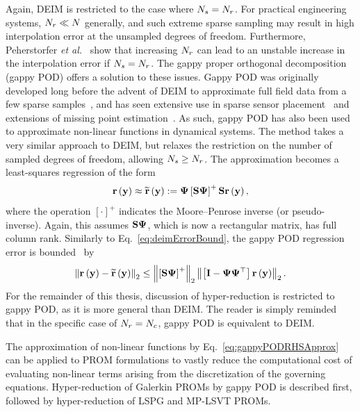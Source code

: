 Again, DEIM is restricted to the case where $N_s = N_r$. For practical engineering systems, $N_r \ll N$ generally, and such extreme sparse sampling may result in high interpolation error at the unsampled degrees of freedom. Furthermore, Peherstorfer \textit{et al.}~\cite{Peherstorfer2020} show that increasing $N_r$ can lead to an unstable increase in the interpolation error if $N_s = N_r$. The gappy proper orthogonal decomposition (gappy POD) offers a solution to these issues. Gappy POD was originally developed long before the advent of DEIM to approximate full field data from a few sparse samples~\cite{Everson1995}, and has seen extensive use in sparse sensor placement~\cite{Willcox2006,ManoharSparseSensor} and extensions of missing point estimation~\cite{Zimmermann2016}. As such, gappy POD has also been used to approximate non-linear functions in dynamical systems. The method takes a very similar approach to DEIM, but relaxes the restriction on the number of sampled degrees of freedom, allowing $N_s \ge N_r$. The approximation becomes a least-squares regression of the form
%
\begin{equation}\label{eq:gappyPODRHSApprox}
    \resFunc{\dummyVec} \approx \resApproxFunc{\dummyVec} \defEq \deimBasis \left[ \sampMat \deimBasis \right]^{+} \sampMat \resFunc{\dummyVec},
\end{equation}
%
where the operation $[\cdot]^+$ indicates the Moore--Penrose inverse (or pseudo-inverse). Again, this assumes $\sampMat \deimBasis$, which is now a rectangular matrix, has full column rank. Similarly to Eq.~\ref{eq:deimErrorBound}, the gappy POD regression error is bounded~\cite{Peherstorfer2020} by
%
\begin{equation}\label{eq:gappyPODErrorBound}
    \left\Vert \resFunc{\dummyVec} - \resApproxFunc{\dummyVec} \right\Vert_2 \le \left\Vert \left[ \sampMat \deimBasis \right]^{+} \right\Vert_2 \left\Vert \left[ \identMat - \deimBasis \deimBasis^\top \right] \resFunc{\dummyVec} \right\Vert_2.
\end{equation}
%
For the remainder of this thesis, discussion of hyper-reduction is restricted to gappy POD, as it is more general than DEIM. The reader is simply reminded that in the specific case of $N_r = N_c$, gappy POD is equivalent to DEIM.

The approximation of non-linear functions by Eq.~\ref{eq:gappyPODRHSApprox} can be applied to PROM formulations to vastly reduce the computational cost of evaluating non-linear terms arising from the discretization of the governing equations. Hyper-reduction of Galerkin PROMs by gappy POD is described first, followed by hyper-reduction of LSPG and MP-LSVT PROMs.

